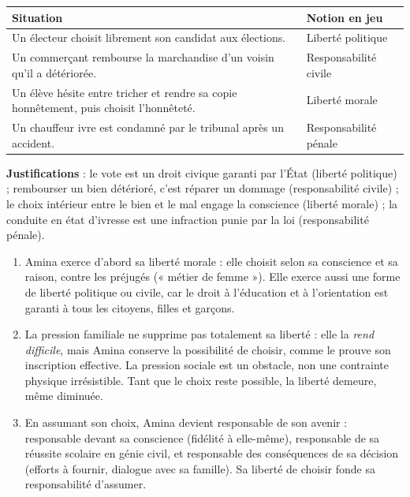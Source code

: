 \documentclass[11pt]{article}
\newcommand{\cle}[1]{{\popxbold\color{popdark}#1}}
\begin{document}
\begin{corrige}
\begin{center}
\begin{tabularx}{\linewidth}{|X|l|}
\hline
\rowcolor{popblueL} \textbf{Situation} & \textbf{Notion en jeu} \\
\hline
Un électeur choisit librement son candidat aux élections. & Liberté politique \\
\hline
Un commerçant rembourse la marchandise d'un voisin qu'il a détériorée. & Responsabilité civile \\
\hline
Un élève hésite entre tricher et rendre sa copie honnêtement, puis choisit l'honnêteté. & Liberté morale \\
\hline
Un chauffeur ivre est condamné par le tribunal après un accident. & Responsabilité pénale \\
\hline
\end{tabularx}
\end{center}
\textbf{Justifications} : le vote est un droit civique garanti par l'État (liberté politique) ; rembourser un bien détérioré, c'est réparer un dommage (responsabilité civile) ; le choix intérieur entre le bien et le mal engage la conscience (liberté morale) ; la conduite en état d'ivresse est une infraction punie par la loi (responsabilité pénale).
\end{corrige}

\begin{corrige}
\begin{enumerate}
\item Amina exerce d'abord sa \cle{liberté morale} : elle choisit selon sa conscience et sa raison, contre les préjugés (« métier de femme »). Elle exerce aussi une forme de liberté politique ou civile, car le droit à l'éducation et à l'orientation est garanti à tous les citoyens, filles et garçons.
\item La pression familiale ne supprime pas totalement sa liberté : elle la \emph{rend difficile}, mais Amina conserve la possibilité de choisir, comme le prouve son inscription effective. La pression sociale est un obstacle, non une contrainte physique irrésistible. Tant que le choix reste possible, la liberté demeure, même diminuée.
\item En assumant son choix, Amina devient responsable de son avenir : responsable devant sa conscience (fidélité à elle-même), responsable de sa réussite scolaire en génie civil, et responsable des conséquences de sa décision (efforts à fournir, dialogue avec sa famille). Sa liberté de choisir fonde sa responsabilité d'assumer.
\end{enumerate}
\end{corrige}
\end{document}
